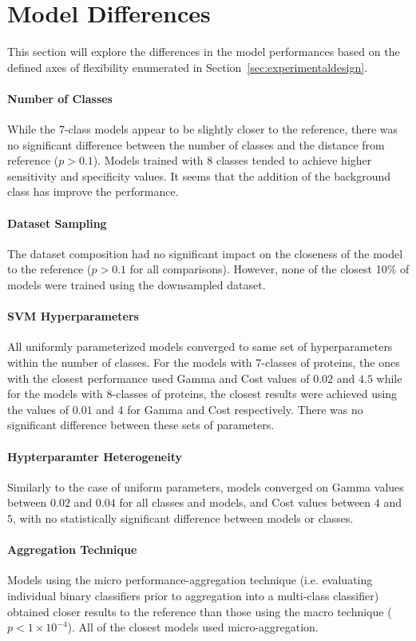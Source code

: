 \section{Model Differences}
This section will explore the differences in the model performances based on the defined axes of
flexibility enumerated in Section~\ref{sec:experimentaldesign}.

\paragraph{Number of Classes}
While the 7-class models appear to be slightly closer to the reference, there was no significant difference between
the number of classes and the distance from reference ($p > 0.1$). Models trained with 8 classes tended to achieve
higher sensitivity and specificity values. It seems that the addition of the background class has improve the 
performance.

\paragraph{Dataset Sampling}
The dataset composition had no significant impact on the closeness of the model to the reference ($p > 0.1$ for all
comparisons). However, none of the closest 10\% of models were trained using the downsampled dataset.

\paragraph{SVM Hyperparameters}
All uniformly parameterized models converged to same set of hyperparameters within the number of classes. For the 
models with 7-classes of proteins, the ones with the closest performance used Gamma and Cost 
values of $0.02$ and $4.5$ while for the models with 8-classes of proteins, the closest results were achieved using 
the values of $0.01$ and $4$ for Gamma and Cost respectively. There was no significant difference between these 
sets of parameters.

\paragraph{Hypterparamter Heterogeneity}
Similarly to the case of uniform parameters, models converged on Gamma values between $0.02$ and $0.04$ for all classes
and models, and Cost values between $4$ and $5$, with no statistically significant difference between models or classes.

\paragraph{Aggregation Technique}
Models using the micro performance-aggregation technique (i.e. evaluating individual binary classifiers prior to
aggregation into a multi-class classifier) obtained closer results to the reference than those using the macro
technique ($p < 1\times 10^{-4}$). All of the closest models used micro-aggregation.

